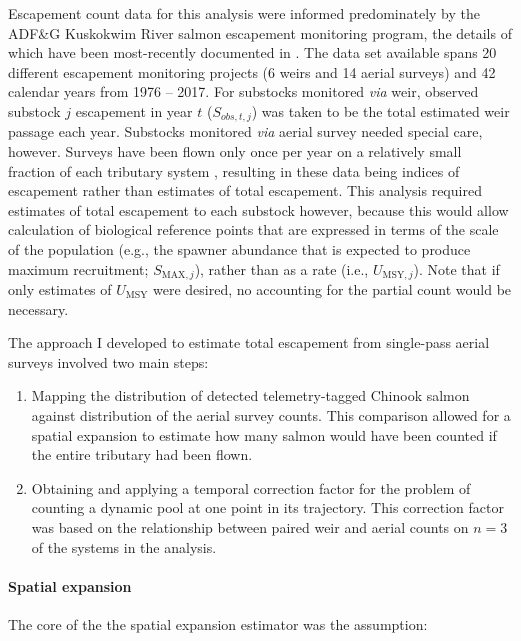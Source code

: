 \documentclass[12pt,]{book}
\let\oldparagraph\paragraph
\renewcommand{\paragraph}[1]{\oldparagraph{#1}\mbox{}}
\theoremstyle{definition}
\theoremstyle{definition}
\theoremstyle{definition}
\theoremstyle{remark}
\begin{document}
\noindent
Escapement count data for this analysis were informed predominately by
the ADF\&G Kuskokwim River salmon escapement monitoring program, the
details of which have been most-recently documented in
\citep{head-liller-2017}. The data set available spans 20 different
escapement monitoring projects (6 weirs and 14 aerial surveys) and 42
calendar years from 1976 -- 2017. For substocks monitored \emph{via}
weir, observed substock \(j\) escapement in year \(t\) (\(S_{obs,t,j}\))
was taken to be the total estimated weir passage each year. Substocks
monitored \emph{via} aerial survey needed special care, however. Surveys
have been flown only once per year on a relatively small fraction of
each tributary system \citep{head-liller-2017}, resulting in these data
being indices of escapement rather than estimates of total escapement.
This analysis required estimates of total escapement to each substock
however, because this would allow calculation of biological reference
points that are expressed in terms of the scale of the population (e.g.,
the spawner abundance that is expected to produce maximum recruitment;
\(S_{\text{MAX},j}\)), rather than as a rate (i.e.,
\(U_{\text{MSY},j}\)). Note that if only estimates of \(U_{\text{MSY}}\)
were desired, no accounting for the partial count would be necessary.

The approach I developed to estimate total escapement from single-pass
aerial surveys involved two main steps:

\begin{enumerate}
\def\labelenumi{(\arabic{enumi})}
\item
  Mapping the distribution of detected telemetry-tagged Chinook salmon
  against distribution of the aerial survey counts. This comparison
  allowed for a spatial expansion to estimate how many salmon would have
  been counted if the entire tributary had been flown.
\item
  Obtaining and applying a temporal correction factor for the problem of
  counting a dynamic pool at one point in its trajectory. This
  correction factor was based on the relationship between paired weir
  and aerial counts on \(n=3\) of the systems in the analysis.
\end{enumerate}

\paragraph{Spatial expansion}\label{spat-expansion}

\noindent
The core of the the spatial expansion estimator was the assumption:
\end{document}
